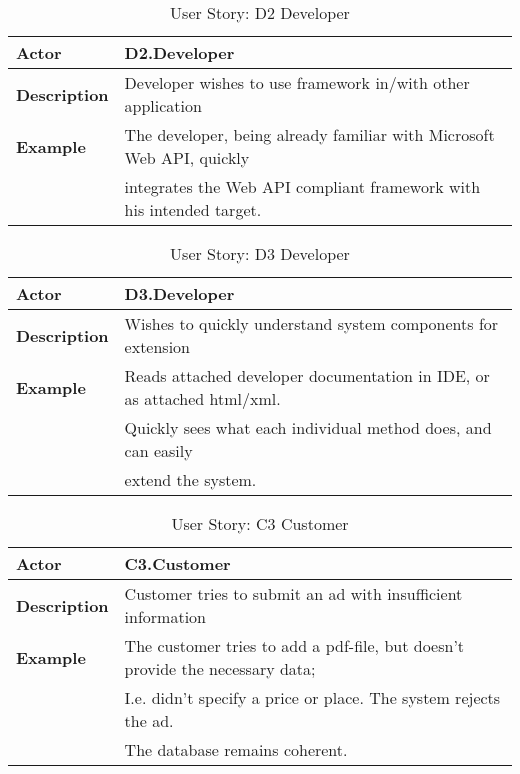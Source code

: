 \begin{table}[H]
\begin{tabular}{| l | l |}
	\hline
	\textbf{Actor} & D2.Developer \\
	\hline
	\textbf{Description} & Developer wishes to use framework in/with other application \\
	\hline
	\textbf{Example} & The developer, being already familiar with Microsoft Web API, quickly \\
	& integrates the Web API compliant framework with his intended target.\\
	\hline
\end{tabular}
\caption{User Story: D2 Developer}
\end{table}

\begin{table}[H]
\begin{tabular}{| l | l |}
	\hline
	\textbf{Actor} & D3.Developer \\
	\hline
	\textbf{Description} & Wishes to quickly understand system components for extension \\
	\hline
	\textbf{Example} & Reads attached developer documentation in IDE, or as attached html/xml.\\
	& Quickly sees what each individual method does, and can easily \\
	& extend the system.\\
	\hline
\end{tabular}
\caption{User Story: D3 Developer}
\end{table}

\begin{table}[H]
\begin{tabular}{| l | l |}
	\hline
	\textbf{Actor} & C3.Customer \\
	\hline
	\textbf{Description} & Customer tries to submit an ad with insufficient information \\
	\hline
	\textbf{Example} & The customer tries to add a pdf-file, but doesn't provide the necessary data;\\
	& I.e. didn't specify a price or place. The system rejects the ad.\\
	& The database remains coherent.\\
	\hline
\end{tabular}
\caption{User Story: C3 Customer}
\end{table}